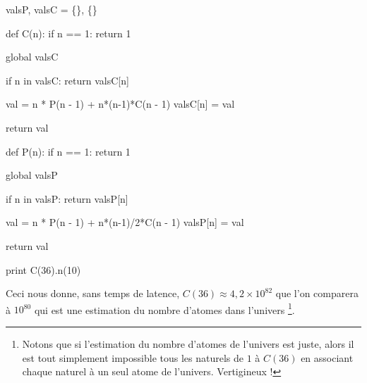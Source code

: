 \bigskip

\begin{myverb}
valsP, valsC = \{\}, \{\}


def C(n):
    if n == 1:
        return 1
        
    global valsC
    
    if n in valsC:
        return valsC[n]

    val      = n * P(n - 1) + n*(n-1)*C(n - 1)  
    valsC[n] = val
    
    return val


def P(n):
    if n == 1:
        return 1

    global valsP
    
    if n in valsP:
        return valsP[n]

    val      = n * P(n - 1) + n*(n-1)/2*C(n - 1)
    valsP[n] = val
    
    return val

  
print C(36).n(10)

\end{myverb}

\bigskip

Ceci nous donne, sans temps de latence, $C(36) \approx 4,\!2 \times 10^{82}$ que l'on comparera à $10^{80}$ qui est une estimation du nombre d'atomes dans l'univers
\footnote{
    Notons que si l'estimation du nombre d'atomes de l'univers est juste, alors il est tout simplement impossible  tous les naturels de $1$ à $C(36)$ en associant chaque naturel à un seul atome de l'univers. Vertigineux !
}.

